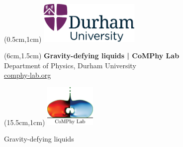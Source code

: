 \documentclass[11pt]{article}
\newlength{\headertobodysep}
\begin{document}
\thispagestyle{empty}

\textblockorigin{0pt}{0pt}

\begin{textblock*}{5cm}(0.5cm,1cm)
    \includegraphics[height=2cm]{../_logosAndRef/Durham-University.pdf}
\end{textblock*}

\begin{textblock*}{9cm}(6cm,1.5cm)
    \centering
    {\large \textbf{Gravity-defying liquids | CoMPhy Lab}}\\[0.2em]
    Department of Physics, Durham University\\[0.3em]
    \href{https://comphy-lab.org}{comphy-lab.org}
\end{textblock*}

\begin{textblock*}{5cm}(15.5cm,1cm) %
    \includegraphics[height=2cm]{../_logosAndRef/CoMPhy-Lab.png}
\end{textblock*}

\vspace*{\headertobodysep}

\begin{center}
    \begin{LARGE}
     Gravity-defying liquids
    \end{LARGE}
\end{center}
\end{document}
